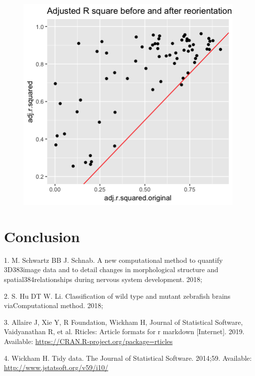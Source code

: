 \documentclass[10pt,letterpaper]{article}
\begin{document}
\begin{figure}[H]
\includegraphics[width=0.8\linewidth]{visualization_paper/adj_r2_before_after_yt} \end{figure}

\hypertarget{conclusion}{%
\section*{Conclusion}\label{conclusion}}

\hypertarget{refs}{}
\leavevmode\hypertarget{ref-Schwartz18}{}%
1. M. Schwartz BB J. Schnab. A new computational method to quantify
3D383image data and to detail changes in morphological structure and
spatial384relationships during nervous system development. 2018;

\leavevmode\hypertarget{ref-Hu18}{}%
2. S. Hu DT W. Li. Classification of wild type and mutant zebrafish
brains viaComputational method. 2018;

\leavevmode\hypertarget{ref-rticles19}{}%
3. Allaire J, Xie Y, R Foundation, Wickham H, Journal of Statistical
Software, Vaidyanathan R, et al. Rticles: Article formats for r markdown
{[}Internet{]}. 2019. Available:
\url{https://CRAN.R-project.org/package=rticles}

\leavevmode\hypertarget{ref-tidy-data}{}%
4. Wickham H. Tidy data. The Journal of Statistical Software. 2014;59.
Available: \url{http://www.jstatsoft.org/v59/i10/}

\nolinenumbers
\end{document}
